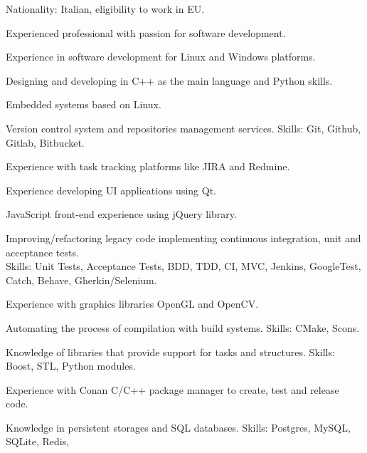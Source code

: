 

\begin{cvparagraph}

  \begin{svitems}
    \item {Nationality: Italian, eligibility to work in EU.}
    \item {Experienced professional with passion for software development.}
    \item {Experience in software development for Linux and Windows platforms.}
    \item {Designing and developing in C++ as the main language and Python skills.}
    \item {Embedded systems based on Linux.}
    \item {Version control system and repositories management services. Skills: Git, Github, Gitlab, Bitbucket.}
    \item {Experience with task tracking platforms like JIRA and Redmine.}
    \item {Experience developing UI applications using Qt.}
    \item {JavaScript front-end experience using jQuery library.}
    \item {Improving/refactoring legacy code implementing continuous integration, unit and acceptance tests.\\
    Skills: Unit Tests, Acceptance Tests, BDD, TDD, CI, MVC, Jenkins, GoogleTest, Catch, Behave,
    Gherkin/Selenium.}
    \item {Experience with graphics libraries OpenGL and OpenCV.}
    \item {Automating the process of compilation with build systems. Skills: CMake, Scons.}
    \item {Knowledge of libraries that provide support for tasks and structures. Skills: Boost, STL, Python modules.}
    \item {Experience with Conan C/C++ package manager to create, test and release code.}
    \item {Knowledge in persistent storages and SQL databases. Skills: Postgres, MySQL, SQLite, Redis,
}
\end{svitems}
\end{cvparagraph}
